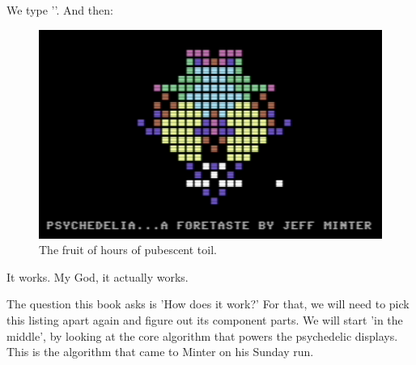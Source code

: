 We type ''. And then: 
\begin{figure}[H]
    \centering
    \begin{adjustbox}{width=12cm,center}
      \includegraphics[width=12cm]{src/listing/itworks.png}%
    \end{adjustbox}
  \caption{The fruit of hours of pubescent toil.}
\end{figure}
It works. My God, it actually works. 

The question this book asks is 'How does it work?' For that, we will
need to pick this listing apart again and figure out its component parts. We will start 'in the middle', by looking at the
core algorithm that powers the psychedelic displays. This is the algorithm that came to Minter on his Sunday run.

